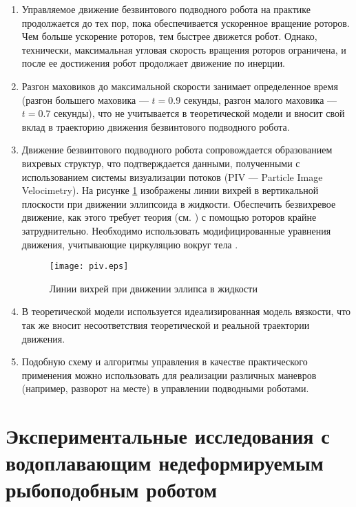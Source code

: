 \begin{enumerate}
	\item	Управляемое движение безвинтового подводного робота на практике продолжается до тех пор, пока обеспечивается ускоренное вращение роторов. Чем больше ускорение роторов, тем быстрее движется робот. Однако, технически, максимальная угловая скорость вращения роторов ограничена, и после ее достижения робот продолжает движение по инерции.
	\item Разгон маховиков до максимальной скорости занимает определенное время (разгон большего маховика --- $t=0.9$ секунды, разгон малого маховика --- $t=0.7$ секунды), что не учитывается в теоретической модели и вносит свой вклад в траекторию движения безвинтового подводного робота.
	\item	Движение безвинтового подводного робота сопровождается образованием вихревых структур, что подтверждается данными, полученными с использованием системы визуализации потоков (PIV --- Particle Image Velocimetry). На рисунке \ref{piv} изображены линии вихрей в вертикальной плоскости при движении эллипсоида в жидкости. Обеспечить безвихревое движение, как этого требует теория (см. \cite{Vetchanin_Mamaev_Tenenev_RCD_2013, Ramodanov_Tenenev_Treschev_RCD_2012}) с помощью роторов крайне затруднительно. Необходимо использовать модифицированные уравнения движения, учитывающие циркуляцию вокруг тела \cite{Kilin_Vetchanin_DAN_2016}.
	
	\begin{figure}[h!]
		\begin{center}
			\texttt{[image: piv.eps]}
			\caption{Линии вихрей при движении эллипса в жидкости} \label{piv}
		\end{center}
	\end{figure}
	
	\item В теоретической модели используется идеализированная модель вязкости, что так же вносит несоответствия теоретической и реальной траектории движения.
	\item Подобную схему и алгоритмы управления в качестве практического применения можно использовать для реализации различных маневров (например, разворот на месте) в управлении подводными роботами.

\end{enumerate}





\section{Экспериментальные исследования с водоплавающим недеформируемым рыбоподобным роботом}\label{sec:ch4/sec3}
	
	
\clearpage